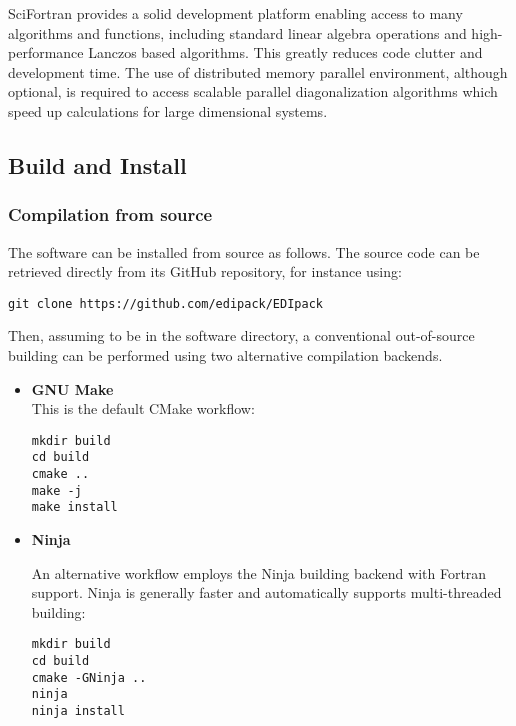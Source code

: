 \documentclass[edipack_sp.tex]{subfiles}
\begin{document}
SciFortran provides a solid development platform enabling access to
many algorithms and functions, including standard linear algebra
operations and high-performance Lanczos based algorithms. This
greatly reduces code clutter and development time.
The use of distributed memory parallel environment, although optional,
is required to access scalable parallel diagonalization algorithms
which speed up calculations for large dimensional systems. 

\subsection{Build and Install}\label{sSecInstallBuildInstall}
\subsubsection{Compilation from source}
The software can be installed from source as follows. The source code can
be retrieved directly from its GitHub repository, for instance using:
\begin{lstlisting}[style=mybash,numbers=none]
git clone https://github.com/edipack/EDIpack 
\end{lstlisting}
Then, assuming to be in the software directory, a conventional
out-of-source building can be performed using two alternative compilation backends.

\begin{itemize}
  \item {\bf GNU Make}\\
This is the default CMake workflow:
\begin{lstlisting}[style=mybash,numbers=none]
mkdir build
cd build
cmake ..
make -j
make install
\end{lstlisting}


\item{\bf Ninja}

An alternative workflow employs the Ninja building backend with
Fortran support. Ninja is generally faster and automatically supports
multi-threaded building:
\begin{lstlisting}[style=mybash,numbers=none]
mkdir build
cd build
cmake -GNinja ..
ninja
ninja install
\end{lstlisting}
\end{itemize}
\end{document}
